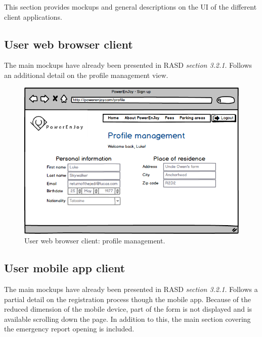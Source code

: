 This section provides mockups and general descriptions on the UI of the different client applications.

\subsection{User web browser client}
	The main mockups have already been presented in RASD \textit{section 3.2.1}.
	Follows an additional detail on the profile management view.

	\begin{figure}[h]
		\includegraphics[width=\textwidth, center]{img/user_interface_design/Website_profile_management.png}
		\caption{User web browser client: profile management.}
	\end{figure}

\subsection{User mobile app client}
	The main mockups have already been presented in RASD \textit{section 3.2.1}.
	Follows a partial detail on the registration process though the mobile app. Because of the reduced dimension of the mobile device, part of the form is not displayed and is available scrolling down the page.
	In addition to this, the main section covering the emergency report opening is included.

